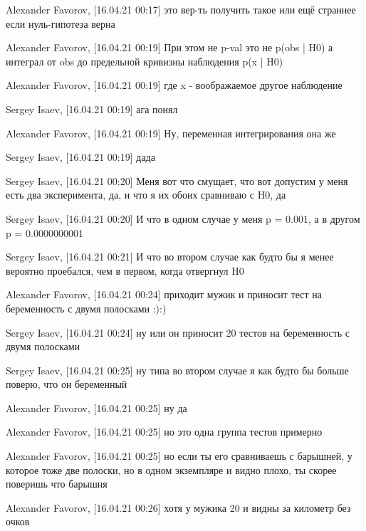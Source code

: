 \documentclass{book}
\begin{document}
Alexander Favorov, [16.04.21 00:17]
это вер-ть получить такое или ещё страннее если нуль-гипотеза верна

Alexander Favorov, [16.04.21 00:19]
При этом не p-val это не  p(obs | H0) а интеграл от obs до предельной кривизны наблюдения  p(x | H0)

Alexander Favorov, [16.04.21 00:19]
где x - воображаемое другое наблюдение

Sergey Isaev, [16.04.21 00:19]
ага понял

Alexander Favorov, [16.04.21 00:19]
Ну, переменная интегрирования она же

Sergey Isaev, [16.04.21 00:19]
дада

Sergey Isaev, [16.04.21 00:20]
Меня вот что смущает, что вот допустим у меня есть два эксперимента, да, и что я их обоих сравниваю с H0, да

Sergey Isaev, [16.04.21 00:20]
И что в одном случае у меня p = 0.001, а в другом p = 0.0000000001

Sergey Isaev, [16.04.21 00:21]
И что во втором случае как будто бы я менее вероятно проебался, чем в первом, когда отвергнул H0

Alexander Favorov, [16.04.21 00:24]
приходит мужик и приносит тест на беременность с двумя полосками :):)

Sergey Isaev, [16.04.21 00:24]
ну или он приносит 20 тестов на беременность с двумя полосками

Sergey Isaev, [16.04.21 00:25]
ну типа во втором случае я как будто бы больше поверю, что он беременный

Alexander Favorov, [16.04.21 00:25]
ну да

Alexander Favorov, [16.04.21 00:25]
но это одна группа тестов примерно

Alexander Favorov, [16.04.21 00:25]
но если ты его сравниваешь с барышней, у которое тоже две полоски, но в одном экземпляре и видно плохо, ты скорее поверишь что барышня

Alexander Favorov, [16.04.21 00:26]
хотя у мужика 20 и видны за километр без очков
\end{document}
